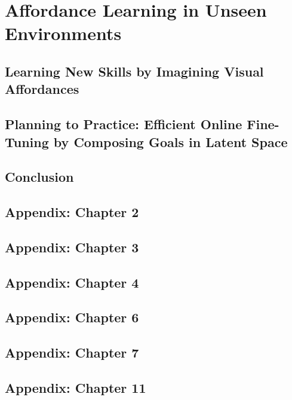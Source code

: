 \documentclass[ titlepage,numbers=noenddot,headinclude,
                footinclude=true,cleardoublepage=empty,abstractoff,
                BCOR=5mm,paper=letter,fontsize=12pt,
                american,
                openany
                ]{scrreprt}
\begin{document}
\part{Affordance Learning in Unseen Environments}

\chapter{Learning New Skills by Imagining Visual Affordances}\label{chapter:val}

\chapter{Planning to Practice: Efficient Online Fine-Tuning by Composing Goals in Latent Space}\label{chapter:ptp}


\chapter{Conclusion}\label{chapter:conclusion}


\printbibliography

\appendix

\chapter{Appendix: Chapter 2}\label{app:rig}


\chapter{Appendix: Chapter 3}\label{app:ccrig}


\chapter{Appendix: Chapter 4}\label{app:skewfit}


\chapter{Appendix: Chapter 6}\label{app:awac}


\chapter{Appendix: Chapter 7}\label{app:iql}


\chapter{Appendix: Chapter 11}\label{app:val}

\end{document}
